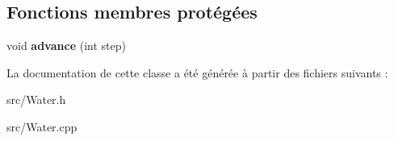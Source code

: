 \subsection*{Fonctions membres protégées}
\begin{DoxyCompactItemize}
\item 
\hypertarget{classProjectile_a8e3b4bae49558a0febfce8c1accea72d}{
void {\bfseries advance} (int step)}
\label{classProjectile_a8e3b4bae49558a0febfce8c1accea72d}

\end{DoxyCompactItemize}


La documentation de cette classe a été générée à partir des fichiers suivants :\begin{DoxyCompactItemize}
\item 
src/Water.h\item 
src/Water.cpp\end{DoxyCompactItemize}
